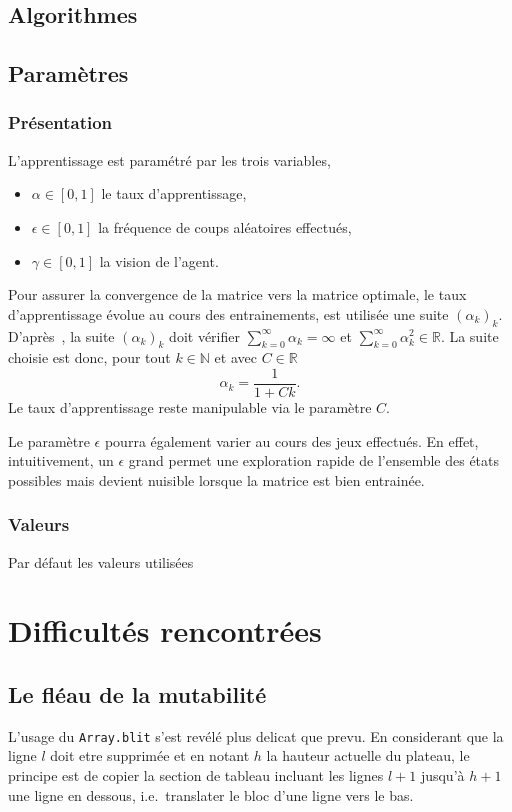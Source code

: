 \documentclass{article}
\newcommand{\R}{\mathbb{R}}
\begin{document}
\subsection{Algorithmes}

\subsection{Param\`etres}
\subsubsection{Pr\'esentation}
L'apprentissage est paramétré par les trois variables,
\begin{itemize}
  \item \(\alpha \in [0, 1]\) le taux d'apprentissage,
  \item \(\epsilon \in [0, 1]\) la fréquence de coups aléatoires effectués,
  \item \(\gamma \in [0, 1]\) la vision de l'agent.
\end{itemize}
Pour assurer la convergence de la matrice vers la matrice optimale,
le taux d'apprentissage évolue au cours des entrainements, est utilisée une
suite \( (\alpha_k)_k \). D'après~\cite{watkins92}, la suite \(
(\alpha_k)_k \) doit vérifier \( \sum_{k=0}^\infty \alpha_k = \infty \) et \(
\sum_{k=0}^\infty \alpha_k^2 \in \R \). La suite choisie est donc, pour tout
\( k \in \mathbb{N} \) et avec \( C \in \R \)
\[
  \alpha_k = \frac{1}{1 + Ck}.
\]
Le taux d'apprentissage reste manipulable via le paramètre \( C \).


Le paramètre \(\epsilon\) pourra \'egalement varier au cours des jeux effectués.
En effet, intuitivement, un \(\epsilon\) grand permet une exploration rapide de
l'ensemble des états possibles mais devient nuisible lorsque la matrice est bien
entrainée.

\subsubsection{Valeurs}
Par défaut les valeurs utilisées


\section{Difficultés rencontrées}

\subsection{Le fl\'eau de la mutabilit\'e}
L'usage du \texttt{Array.blit} s'est revélé plus delicat que prevu. En
considerant que la ligne \(l\) doit etre supprimée et en notant \(h\) la hauteur
actuelle du plateau, le principe est de copier la section de tableau incluant
les lignes \(l+1\) jusqu'à \(h+1\) une ligne en dessous, i.e.\ translater le
bloc d'une ligne vers le bas.
\end{document}
